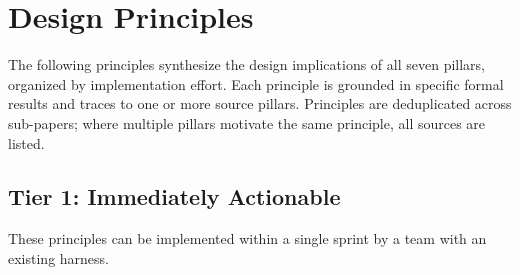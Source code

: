 \section{Design Principles}
\label{sec:principles}

The following principles synthesize the design implications of all seven pillars, organized by implementation effort. Each principle is grounded in specific formal results and traces to one or more source pillars. Principles are deduplicated across sub-papers; where multiple pillars motivate the same principle, all sources are listed.

\subsection{Tier 1: Immediately Actionable}
\label{sec:tier1}

These principles can be implemented within a single sprint by a team with an existing harness.

